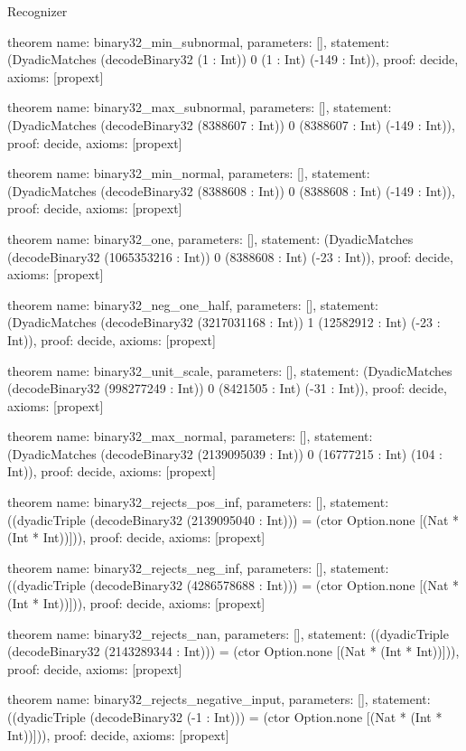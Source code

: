 \begin{lexlean}{Recognizer}
\begin{semanticmodule}
theorem{
  name: binary32_min_subnormal,
  parameters: [],
  statement: (DyadicMatches (decodeBinary32 (1 : Int)) 0 (1 : Int) (-149 : Int)),
  proof: decide{},
  axioms: [propext]
}

theorem{
  name: binary32_max_subnormal,
  parameters: [],
  statement: (DyadicMatches (decodeBinary32 (8388607 : Int)) 0 (8388607 : Int) (-149 : Int)),
  proof: decide{},
  axioms: [propext]
}

theorem{
  name: binary32_min_normal,
  parameters: [],
  statement: (DyadicMatches (decodeBinary32 (8388608 : Int)) 0 (8388608 : Int) (-149 : Int)),
  proof: decide{},
  axioms: [propext]
}

theorem{
  name: binary32_one,
  parameters: [],
  statement: (DyadicMatches (decodeBinary32 (1065353216 : Int)) 0 (8388608 : Int) (-23 : Int)),
  proof: decide{},
  axioms: [propext]
}

theorem{
  name: binary32_neg_one_half,
  parameters: [],
  statement: (DyadicMatches (decodeBinary32 (3217031168 : Int)) 1 (12582912 : Int) (-23 : Int)),
  proof: decide{},
  axioms: [propext]
}

theorem{
  name: binary32_unit_scale,
  parameters: [],
  statement: (DyadicMatches (decodeBinary32 (998277249 : Int)) 0 (8421505 : Int) (-31 : Int)),
  proof: decide{},
  axioms: [propext]
}

theorem{
  name: binary32_max_normal,
  parameters: [],
  statement: (DyadicMatches (decodeBinary32 (2139095039 : Int)) 0 (16777215 : Int) (104 : Int)),
  proof: decide{},
  axioms: [propext]
}

theorem{
  name: binary32_rejects_pos_inf,
  parameters: [],
  statement: ((dyadicTriple (decodeBinary32 (2139095040 : Int))) = (ctor Option.none [(Nat * (Int * Int))])),
  proof: decide{},
  axioms: [propext]
}

theorem{
  name: binary32_rejects_neg_inf,
  parameters: [],
  statement: ((dyadicTriple (decodeBinary32 (4286578688 : Int))) = (ctor Option.none [(Nat * (Int * Int))])),
  proof: decide{},
  axioms: [propext]
}

theorem{
  name: binary32_rejects_nan,
  parameters: [],
  statement: ((dyadicTriple (decodeBinary32 (2143289344 : Int))) = (ctor Option.none [(Nat * (Int * Int))])),
  proof: decide{},
  axioms: [propext]
}

theorem{
  name: binary32_rejects_negative_input,
  parameters: [],
  statement: ((dyadicTriple (decodeBinary32 (-1 : Int))) = (ctor Option.none [(Nat * (Int * Int))])),
  proof: decide{},
  axioms: [propext]
}


\end{semanticmodule}
\end{lexlean}
